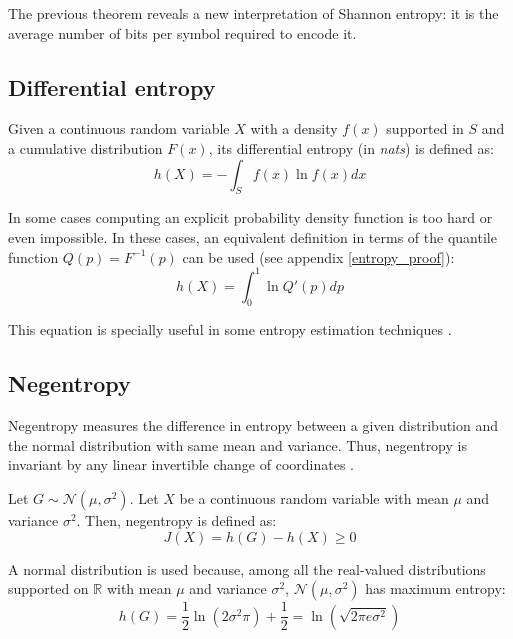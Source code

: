 The previous theorem reveals a new interpretation of Shannon entropy: it is the average number of bits per symbol required to encode it.

\subsection{Differential entropy}
Given a continuous random variable $X$ with a density $f(x)$ supported in $S$ and a cumulative distribution $F(x)$, its differential entropy (in \textit{nats}) is defined as:
\begin{equation} \label{eq:differential_entropy}
h(X) = - \int_{S}^{} f(x) \ln f(x) dx
\end{equation}

In some cases computing an explicit probability density function is too hard or even impossible. In these cases, an equivalent definition in terms of the quantile function $Q(p) = F^{-1}(p)$ can be used (see appendix \ref{entropy_proof}):
\begin{equation} \label{eq:differential_entropy_q}
h(X) = \int_{0}^{1} \ln Q'(p) dp
\end{equation}

This equation is specially useful in some entropy estimation techniques \parencite{Vasicek}.

\subsection{Negentropy} \label{sec:negentropy}
Negentropy measures the difference in entropy between a given distribution and the normal distribution with same mean and variance. Thus, negentropy is invariant by any linear invertible change of coordinates \parencite{negentropy}. 

Let $G \sim \mathscr{N}(\mu, \sigma^2)$. Let $X$ be a continuous random variable with mean $\mu$ and variance $\sigma^2$. Then, negentropy is defined as:
\begin{equation}
J(X) = h(G) - h(X) \geq 0
\end{equation}

A normal distribution is used because, among all the real-valued distributions supported on $\mathbb{R}$ with mean $\mu$ and variance $\sigma^2$, $\mathscr{N}(\mu, \sigma^2)$ has maximum entropy:
\begin{equation}
h(G) = \frac{1}{2} \ln \left(2\sigma^2\pi\right) + \frac{1}{2} = \ln\left(\sqrt{2\pi e \sigma^2}\right)
\end{equation}

